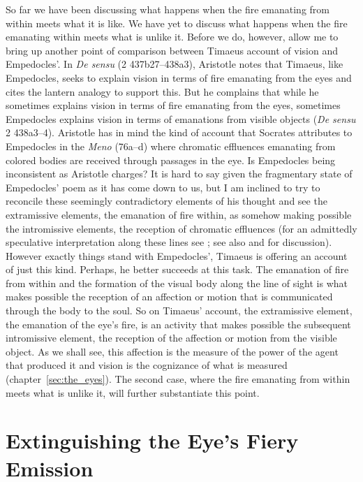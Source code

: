 So far we have been discussing what happens when the fire emanating from within meets what it is like. We have yet to discuss what happens when the fire emanating within meets what is unlike it. Before we do, however, allow me to bring up another point of comparison between Timaeus account of vision and Empedocles'. In \emph{De sensu} (2 437b27--438a3), Aristotle notes that Timaeus, like Empedocles, seeks to explain vision in terms of fire emanating from the eyes and cites the lantern analogy to support this. But he complains that while he sometimes explains vision in terms of fire emanating from the eyes, sometimes Empedocles explains vision in terms of emanations from visible objects (\emph{De sensu} 2 438a3--4). Aristotle has in mind the kind of account that Socrates attributes to Empedocles in the \emph{Meno} (76a--d) where chromatic effluences emanating from colored bodies are received through passages in the eye. Is Empedocles being inconsistent as Aristotle charges? It is hard to say given the fragmentary state of Empedocles' poem as it has come down to us, but I am inclined to try to reconcile these seemingly contradictory elements of his thought and see the extramissive elements, the emanation of fire within, as somehow making possible the intromissive elements, the reception of chromatic effluences (for an admittedly speculative interpretation along these lines see \citealt[chapter 1.3]{Kalderon:2015fr}; see also \citealt[152 n5]{Hammond:1903aa} and \citealt[137]{Ross:1906fk} for discussion). However exactly things stand with Empedocles', Timaeus is offering an account of just this kind. Perhaps, he better succeeds at this task. The emanation of fire from within and the formation of the visual body along the line of sight is what makes possible the reception of an affection or motion that is communicated through the body to the soul. So on Timaeus' account, the extramissive element, the emanation of the eye's fire, is an activity that makes possible the subsequent intromissive element, the reception of the affection or motion from the visible object. As we shall see, this affection is the measure of the power of the agent that produced it and vision is the cognizance of what is measured (chapter~\ref{sec:the_eyes}). The second case, where the fire emanating from within meets what is unlike it, will further substantiate this point.


\section{Extinguishing the Eye's Fiery Emission} %
\label{sec:the_quenching_of_the_eye_s_fire}

